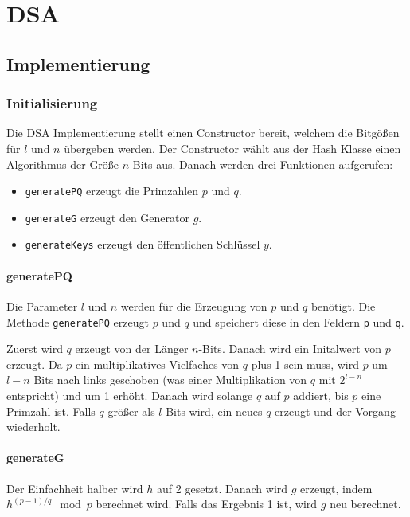 \chapter{DSA}

\section{Implementierung}

\subsection{Initialisierung}
Die DSA Implementierung stellt einen Constructor bereit, welchem die Bitgößen für $l$ und $n$ übergeben werden. Der Constructor wählt aus der Hash Klasse einen Algorithmus der Größe $n$-Bits aus. Danach werden drei Funktionen aufgerufen:
\begin{itemize}
    \item \texttt{generatePQ} erzeugt die Primzahlen $p$ und $q$.
    \item \texttt{generateG} erzeugt den Generator $g$.
    \item \texttt{generateKeys} erzeugt den öffentlichen Schlüssel $y$.
\end{itemize}

\subsubsection{generatePQ}
Die Parameter $l$ und $n$ werden für die Erzeugung von $p$ und $q$ benötigt. Die Methode \texttt{generatePQ} erzeugt $p$ und $q$ und speichert diese in den Feldern \texttt{p} und \texttt{q}.

Zuerst wird $q$ erzeugt von der Länger $n$-Bits. Danach wird ein Initalwert von $p$ erzeugt. Da $p$ ein multiplikatives Vielfaches von $q$ plus 1 sein muss, wird $p$ um $l-n$ Bits nach links geschoben (was einer Multiplikation von $q$ mit $2^{l-n}$ entspricht) und um 1 erhöht. Danach wird solange $q$ auf $p$ addiert, bis $p$ eine Primzahl ist.
Falls $q$ größer als $l$ Bits wird, ein neues $q$ erzeugt und der Vorgang wiederholt.

\subsubsection{generateG}
Der Einfachheit halber wird $h$ auf 2 gesetzt. Danach wird $g$ erzeugt, indem $h^{(p-1)/q} \mod p$ berechnet wird. Falls das Ergebnis 1 ist, wird $g$ neu berechnet.

